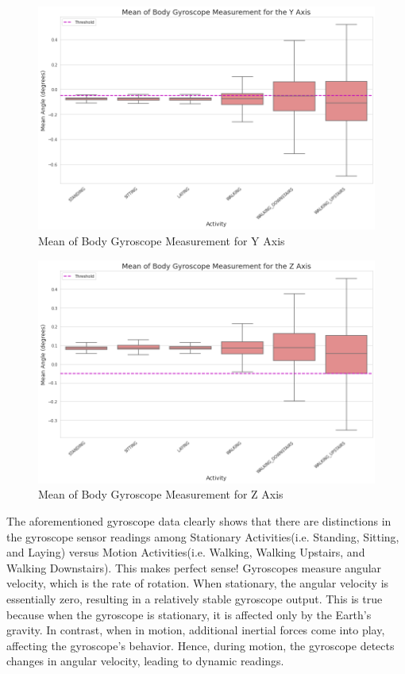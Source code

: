 \documentclass[conference]{IEEEtran}
\begin{document}
\begin{figure}[h!]
	\includegraphics[width= 1.0 \linewidth]{mean_body_gyroscope_y.png}
	\centering
	\caption{Mean of Body Gyroscope Measurement for Y Axis}
	\label{mean_body_gyroscope_y.png}
\end{figure}

\begin{figure}[h!]
	\includegraphics[width= 1.0 \linewidth]{mean_body_gyroscope_z.png}
	\centering
	\caption{Mean of Body Gyroscope Measurement for Z Axis}
	\label{mean_body_gyroscope_z.png}
\end{figure}

The aforementioned gyroscope data clearly shows that there are distinctions in the gyroscope sensor readings among Stationary Activities(i.e. Standing, Sitting, and Laying) versus Motion Activities(i.e. Walking, Walking Upstairs, and Walking Downstairs). This makes perfect sense! Gyroscopes measure angular velocity, which is the rate of rotation. When stationary, the angular velocity is essentially zero, resulting in a relatively stable gyroscope output. This is true because when the gyroscope is stationary, it is affected only by the Earth's gravity. In contrast, when in motion, additional inertial forces come into play, affecting the gyroscope's behavior. Hence, during motion, the gyroscope detects changes in angular velocity, leading to dynamic readings.
\end{document}
